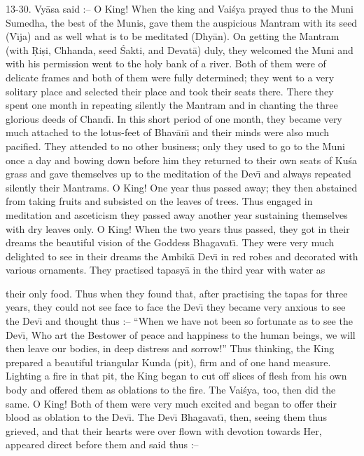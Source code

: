 13-30. Vy\=asa said :-- O King! When the king and Vai\'sya prayed thus to the Muni Sumedha, the best of the Munis, gave them the auspicious Mantram with its seed (V\={\i}ja) and as well what is to be meditated (Dhy\=an). On getting the Mantram (with \d{R}i\d{s}i, Chhanda, seed \'Sakti, and Devat\=a) duly, they welcomed the Muni and with his permission went to the holy bank of a river. Both of them were of delicate frames and both of them were fully determined; they went to a very solitary place and selected their place and took their seats there. There they spent one month in repeating silently the Mantram and in chanting the three glorious deeds of Chand\={\i}. In this short period of one month, they became very much attached to the lotus-feet of Bhav\=an\={\i} and their minds were also much pacified. They attended to no other business; only they used to go to the Muni once a day and bowing down before him they returned to their own seats of Ku\'sa grass and gave themselves up to the meditation of the Dev\={\i} and always repeated silently their Mantrams. O King! One year thus passed away; they then abstained from taking fruits and subsisted on the leaves of trees. Thus engaged in meditation and asceticism they passed away another year sustaining themselves with dry leaves only. O King! When the two years thus passed, they got in their dreams the beautiful vision of the Goddess Bhagavat\={\i}. They were very much delighted to see in their dreams the Ambik\=a Dev\={\i} in red robes and decorated with various ornaments. They practised tapasy\=a in the third year with water as

their only food. Thus when they found that, after practising the tapas for three years, they could not see face to face the Dev\={\i} they became very anxious to see the Dev\={\i} and thought thus :-- ``When we have not been so fortunate as to see the Dev\={\i}, Who art the Bestower of peace and happiness to the human beings, we will then leave our bodies, in deep distress and sorrow!'' Thus thinking, the King prepared a beautiful triangular Kunda (pit), firm and of one hand measure. Lighting a fire in that pit, the King began to cut off slices of flesh from his own body and offered them as oblations to the fire. The Vai\'sya, too, then did the same. O King! Both of them were very much excited and began to offer their blood as oblation to the Dev\={\i}. The Dev\={\i} Bhagavat\={\i}, then, seeing them thus grieved, and that their hearts were over flown with devotion towards Her, appeared direct before them and said thus :--

